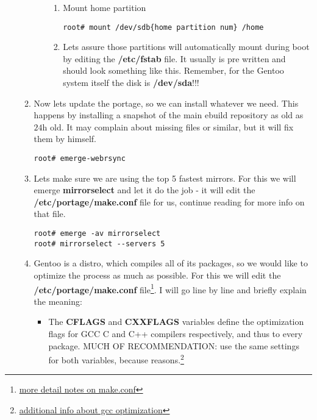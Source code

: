 \documentclass[10pt,a4paper]{article}
\begin{document}
\begin{enumerate}
\begin{enumerate}[label*=\arabic*.]
\begin{enumerate}[label*=\arabic*.]
\begin{enumerate}[label*=\arabic*.]
					\item Mount home partition

					\begin{lstlisting}[style=BashInputRoot]
root# mount /dev/sdb{home partition num} /home					
					\end{lstlisting}
				
					\item Lets assure those partitions will automatically mount during boot by editing the \textbf{/etc/fstab} file. It usually is pre written and should look something like this. Remember, for the Gentoo system itself the disk is \textbf{/dev/sda}!!!



				\end{enumerate}
			
			\end{enumerate}
				
			\item Now lets update the portage, so we can install whatever we need. This happens by installing a snapshot of the main ebuild repository as old as $ 24\mbox{h} $ old. It may complain about missing files or similar, but it will fix them by himself. 
			\begin{lstlisting}[style=BashInputRoot]					
root# emerge-webrsync				
			\end{lstlisting}
			
			\item Lets make sure we are using the top 5 fastest mirrors. For this we will emerge \textbf{mirrorselect} and let it do the job - it will edit the \textbf{/etc/portage/make.conf} file for us, continue reading for more info on that file.
			\begin{lstlisting}[style=BashInputRoot]					
root# emerge -av mirrorselect
root# mirrorselect --servers 5
			\end{lstlisting}

			\item Gentoo is a distro, which compiles all of its packages, so we would like to optimize the process as much as possible. For this we will edit the \textbf{/etc/portage/make.conf} file\footnote{ \href{https://wiki.gentoo.org/wiki//etc/portage/make.conf}{more detail notes on make.conf}}. I will go line by line and briefly explain the meaning:
			
			\begin{itemize}
				\item The \textbf{CFLAGS} and \textbf{CXXFLAGS} variables define the optimization flags for GCC C and C++ compilers respectively, and thus to every package. MUCH OF RECOMMENDATION: use the same settings for both variables, because reasons.\footnote{ \href{https://wiki.gentoo.org/wiki/GCC_optimization}{additional info about gcc optimization}}
				

\end{itemize}
\end{enumerate}
\end{enumerate}
\end{document}
